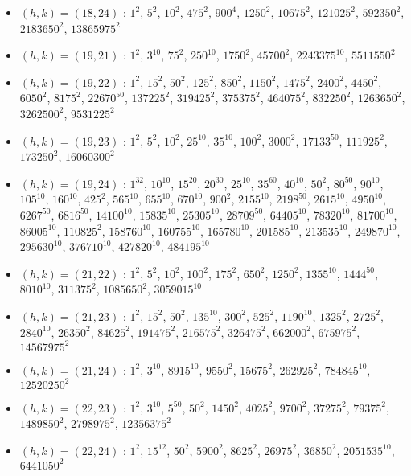 \begin{itemize}
\item $(h,k)=(18,24)$ : $1^{2}$, $5^{2}$, $10^{2}$, $475^{2}$, $900^{4}$, $1250^{2}$, $10675^{2}$, $121025^{2}$, $592350^{2}$, $2183650^{2}$, $13865975^{2}$
\item $(h,k)=(19,21)$ : $1^{2}$, $3^{10}$, $75^{2}$, $250^{10}$, $1750^{2}$, $45700^{2}$, $2243375^{10}$, $5511550^{2}$
\item $(h,k)=(19,22)$ : $1^{2}$, $15^{2}$, $50^{2}$, $125^{2}$, $850^{2}$, $1150^{2}$, $1475^{2}$, $2400^{2}$, $4450^{2}$, $6050^{2}$, $8175^{2}$, $22670^{50}$, $137225^{2}$, $319425^{2}$, $375375^{2}$, $464075^{2}$, $832250^{2}$, $1263650^{2}$, $3262500^{2}$, $9531225^{2}$
\item $(h,k)=(19,23)$ : $1^{2}$, $5^{2}$, $10^{2}$, $25^{10}$, $35^{10}$, $100^{2}$, $3000^{2}$, $17133^{50}$, $111925^{2}$, $173250^{2}$, $16060300^{2}$
\item $(h,k)=(19,24)$ : $1^{32}$, $10^{10}$, $15^{20}$, $20^{30}$, $25^{10}$, $35^{60}$, $40^{10}$, $50^{2}$, $80^{50}$, $90^{10}$, $105^{10}$, $160^{10}$, $425^{2}$, $565^{10}$, $655^{10}$, $670^{10}$, $900^{2}$, $2155^{10}$, $2198^{50}$, $2615^{10}$, $4950^{10}$, $6267^{50}$, $6816^{50}$, $14100^{10}$, $15835^{10}$, $25305^{10}$, $28709^{50}$, $64405^{10}$, $78320^{10}$, $81700^{10}$, $86005^{10}$, $110825^{2}$, $158760^{10}$, $160755^{10}$, $165780^{10}$, $201585^{10}$, $213535^{10}$, $249870^{10}$, $295630^{10}$, $376710^{10}$, $427820^{10}$, $484195^{10}$
\item $(h,k)=(21,22)$ : $1^{2}$, $5^{2}$, $10^{2}$, $100^{2}$, $175^{2}$, $650^{2}$, $1250^{2}$, $1355^{10}$, $1444^{50}$, $8010^{10}$, $311375^{2}$, $1085650^{2}$, $3059015^{10}$
\item $(h,k)=(21,23)$ : $1^{2}$, $15^{2}$, $50^{2}$, $135^{10}$, $300^{2}$, $525^{2}$, $1190^{10}$, $1325^{2}$, $2725^{2}$, $2840^{10}$, $26350^{2}$, $84625^{2}$, $191475^{2}$, $216575^{2}$, $326475^{2}$, $662000^{2}$, $675975^{2}$, $14567975^{2}$
\item $(h,k)=(21,24)$ : $1^{2}$, $3^{10}$, $8915^{10}$, $9550^{2}$, $15675^{2}$, $262925^{2}$, $784845^{10}$, $12520250^{2}$
\item $(h,k)=(22,23)$ : $1^{2}$, $3^{10}$, $5^{50}$, $50^{2}$, $1450^{2}$, $4025^{2}$, $9700^{2}$, $37275^{2}$, $79375^{2}$, $1489850^{2}$, $2798975^{2}$, $12356375^{2}$
\item $(h,k)=(22,24)$ : $1^{2}$, $15^{12}$, $50^{2}$, $5900^{2}$, $8625^{2}$, $26975^{2}$, $36850^{2}$, $2051535^{10}$, $6441050^{2}$

\end{itemize}
